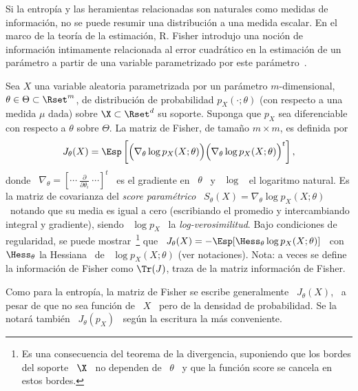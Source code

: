 \label{Ssec:SZ:Fisher}

Si la  entrop\'ia y las heramientas  relacionadas son naturales  como medidas de
informaci\'on, no se  puede resumir una distribuci\'on a  una medida escalar. En
el marco de la teor\'ia de  la estimaci\'on, R. Fisher introdujo una noci\'on de
informaci\'on intimamente  relacionada al error cuadr\'atico  en la estimaci\'on
de   un  par\'ametro   a  partir   de  una   variable  parametrizado   por  este
par\'ametro~\cite{Fis22, Fis25:07, Kay93, Bos07, CovTho06, Fri04}.

\begin{definicion}
\label{Def:SZ:MatrizFisherParametrica}
%
  Sea   $X$   una   variable   aleatoria  parametrizada   por   un   par\'ametro
  $m$-dimensional,  $\theta \in  \Theta \subset  \Rset^m$, de  distribuci\'on de
  probabilidad $p_X(\cdot;\theta)$ (con respecto a  una medida $\mu$ dada) sobre
  $\X  \subset \Rset^d$  su soporte.  Suponga  que $p_X$  sea diferenciable  con
  respecto  a  $\theta$  sobre  $\Theta$.   La matriz  de  Fisher,  de  tama\~no
  $m \times m$, es definida por
  \[
  J_\theta(X)  =  \Esp\left[  \Big(  \nabla_\theta \log  p_X(X;\theta)  \Big)
    \Big( \nabla_\theta \log p_X(X;\theta) \Big)^t \right],
  \]
  donde \  $\nabla_\theta = \left[ \cdots  \: \frac{\partial}{\partial \theta_i}
    \: \cdots  \right]^t$ \  es el gradiente  en \  $\theta$ \ y  \ $\log$  \ el
  logaritmo natural.  Es la matriz de covarianza del {\it score param\'etrico} \
  $S_\theta(X) =  \nabla_\theta \log  p_X(X;\theta)$ \ notando  que su  media es
  igual a cero (escribiando el  promedio y intercambiando integral y gradiente),
  siendo  \  $\log p_X$  \  la  {\it  log-verosimilitud}.  Bajo  condiciones  de
  regularidad, se puede mostrar~\footnote{Es  una consecuencia del teorema de la
    divergencia, suponiendo que los bordes del soporte \ $\X$ \ no dependen de \
    $\theta$ \  y que  la funci\'on score  se cancela  en estos bordes.}   que \
  $J_\theta(X) =  - \Esp[\Hess_\theta \log p_X(X;\theta)]$  \ con $\Hess_\theta$
  la  Hessiana
  \ de  \ $\log  p_X(X;\theta)$ (ver  notaciones).  Nota: a  veces se  define la
  informaci\'on de  Fisher como  $\Tr(J)$, traza de  la matriz  informaci\'on de
  Fisher.
\end{definicion}
%
Como  para  la  entrop\'ia,  la  matriz  de Fisher  se  escribe  generalmente  \
$J_\theta(X)$, \ a pesar de que no sea  funci\'on de \ $X$ \ pero de la densidad
de  probabilidad.  Se  la  notar\'a  tambi\'en \  $J_\theta(p_X)$  \ seg\'un  la
escritura la m\'as conveniente.

